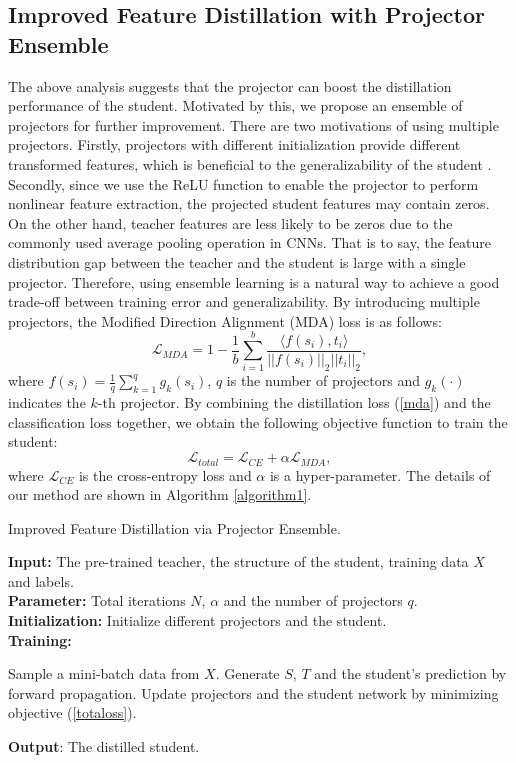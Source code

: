 \documentclass{article}
\begin{document}
\subsection{Improved Feature Distillation with Projector Ensemble}
The above analysis suggests that the projector can boost the distillation performance of the student. Motivated by this, we propose an ensemble of projectors for further improvement. There are two motivations of using multiple projectors. Firstly, projectors with different initialization provide different transformed features, which is beneficial to the generalizability of the student \cite{ensemblepaper2,ensemblepaper}. Secondly, since we use the ReLU function to enable the projector to perform nonlinear feature extraction, the projected student features may contain zeros. On the other hand, teacher features are 
less likely to be zeros due to the commonly used average pooling operation in CNNs. That is to say, the feature distribution gap between the teacher and the student is large with a single projector. Therefore, using ensemble learning is a natural way to achieve a good trade-off between training error and generalizability. By introducing multiple projectors, the Modified Direction Alignment (MDA) loss is as follows:
\begin{equation}
    \mathcal{L}_{MDA} = 1-\frac{1}{b}\sum_{i=1}^b\frac{\langle f(s_i),t_i\rangle}{||f(s_i)||_2||t_i||_2},
    \label{mda}
\end{equation}
where $f(s_i)=\frac{1}{q}\sum_{k=1}^q g_k(s_i)$, $q$ is the number of projectors and $g_k(\cdot)$ indicates the $k$-th projector. By combining the distillation loss (\ref{mda}) and the classification loss together, we obtain the following objective function to train the student:
\begin{equation}
    \mathcal{L}_{total} = \mathcal{L}_{CE} + \alpha \mathcal{L}_{MDA},
    \label{totaloss}
\end{equation}
where $\mathcal{L}_{CE}$ is the cross-entropy loss and $\alpha$ is a hyper-parameter. The details of our method are shown in Algorithm \ref{algorithm1}.


\begin{algorithm}[tb]
\caption{Improved Feature Distillation via Projector Ensemble.}
\label{alg:algorithm}
\textbf{Input:} The pre-trained teacher, the structure of the student, training data $X$ and labels. \\
\textbf{Parameter:} Total iterations $N$, $\alpha$ and the number of projectors $q$.\\
\textbf{Initialization:} Initialize different projectors and the student.
\\
\textbf{Training:} 
\begin{algorithmic}[1] %
\STATE Sample a mini-batch data from $X$.
\STATE Generate $S$, $T$ and the student's prediction by forward propagation.
\STATE Update projectors and the student network by minimizing objective (\ref{totaloss}).
\ENDFOR
\end{algorithmic}
\textbf{Output}: The distilled student. 
\label{algorithm1}
\end{algorithm}
\end{document}
